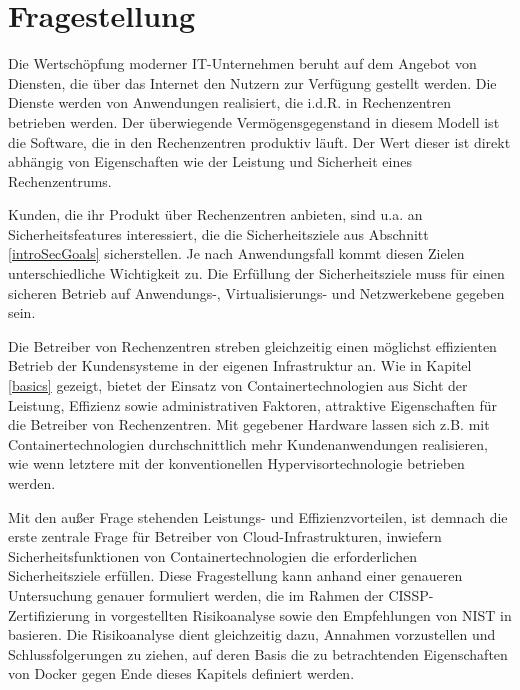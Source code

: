 \documentclass[../main.tex]{subfiles}
\begin{document}
\chapter{Fragestellung}
\label{question}
  Die Wertschöpfung moderner IT-Unternehmen beruht auf dem Angebot von Diensten, die über das Internet den Nutzern zur Verfügung gestellt werden. Die Dienste werden von Anwendungen realisiert, die i.d.R. in Rechenzentren betrieben werden. Der überwiegende Vermögensgegenstand in diesem Modell ist die Software, die in den Rechenzentren produktiv läuft. Der Wert dieser ist direkt abhängig von Eigenschaften wie der Leistung und Sicherheit eines Rechenzentrums.

  Kunden, die ihr Produkt über Rechenzentren anbieten, sind u.a. an Sicherheitsfeatures interessiert, die die Sicherheitsziele aus Abschnitt \ref{introSecGoals} sicherstellen. Je nach Anwendungsfall kommt diesen Zielen unterschiedliche Wichtigkeit zu. Die Erfüllung der Sicherheitsziele muss für einen sicheren Betrieb auf Anwendungs-, Virtualisierungs- und Netzwerkebene gegeben sein.

  Die Betreiber von Rechenzentren streben gleichzeitig einen möglichst effizienten Betrieb der Kundensysteme in der eigenen Infrastruktur an. Wie in Kapitel \ref{basics} gezeigt, bietet der Einsatz von Containertechnologien aus Sicht der Leistung, Effizienz sowie administrativen Faktoren, attraktive Eigenschaften für die Betreiber von Rechenzentren. Mit gegebener Hardware lassen sich z.B. mit Containertechnologien durchschnittlich mehr Kundenanwendungen realisieren, wie wenn letztere mit der konventionellen Hypervisortechnologie betrieben werden.


  Mit den außer Frage stehenden Leistungs- und Effizienzvorteilen, ist demnach die erste zentrale Frage für Betreiber von Cloud-Infrastrukturen, inwiefern Sicherheitsfunktionen von Containertechnologien die erforderlichen Sicherheitsziele erfüllen. Diese Fragestellung kann anhand einer genaueren Untersuchung genauer formuliert werden, die im Rahmen der \acrshort{CISSP}-Zertifizierung in \cite[S.36]{CISSP} vorgestellten Risikoanalyse sowie den Empfehlungen von NIST in \cite[S.23]{nist} basieren. Die Risikoanalyse dient gleichzeitig dazu, Annahmen vorzustellen und Schlussfolgerungen zu ziehen, auf deren Basis die zu betrachtenden Eigenschaften von Docker gegen Ende dieses Kapitels definiert werden.
\end{document}

